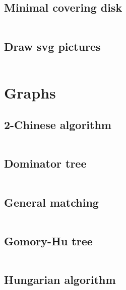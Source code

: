 \documentclass{article}
\begin{document}
\subsection{Minimal covering disk}
\inputminted[mathescape, breaklines, breakafter=(, tabsize=2, frame=lines, showtabs, tab=|\ , tabcolor=lightgray]{c++}{./geometry/min-disk/min-disk.cpp}
\subsection{Draw svg pictures}
\inputminted[mathescape, breaklines, breakafter=(, tabsize=2, frame=lines, showtabs, tab=|\ , tabcolor=lightgray]{c++}{./geometry/svg-draw/svg-draw.cpp}
\section{Graphs}
\subsection{2-Chinese algorithm}
\inputminted[mathescape, breaklines, breakafter=(, tabsize=2, frame=lines, showtabs, tab=|\ , tabcolor=lightgray]{c++}{./graphs/2-chinese/2-chinese.cpp}
\subsection{Dominator tree}
\inputminted[mathescape, breaklines, breakafter=(, tabsize=2, frame=lines, showtabs, tab=|\ , tabcolor=lightgray]{c++}{./graphs/dominator-tree/dominator-tree.cpp}
\subsection{General matching}
\inputminted[mathescape, breaklines, breakafter=(, tabsize=2, frame=lines, showtabs, tab=|\ , tabcolor=lightgray]{c++}{./graphs/general-matching/general-matching.cpp}
\subsection{Gomory-Hu tree}
\inputminted[mathescape, breaklines, breakafter=(, tabsize=2, frame=lines, showtabs, tab=|\ , tabcolor=lightgray]{c++}{./graphs/gomory-hu/gomory-hu.cpp}
\subsection{Hungarian algorithm}
\inputminted[mathescape, breaklines, breakafter=(, tabsize=2, frame=lines, showtabs, tab=|\ , tabcolor=lightgray]{c++}{./graphs/hungarian-algorithm/hungarian-algorithm.cpp}
\end{document}
